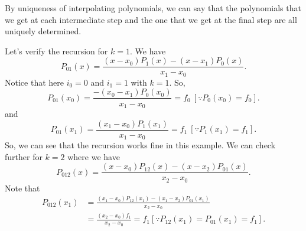 By uniqueness of interpolating polynomials, we can say that the polynomials that we get at each intermediate step and the one that we get at the final step are all uniquely determined.
\begin{example}
   Let's verify the recursion for $k=1$. We have 
   \[
      P_{01}(x) = \frac{(x-x_0)P_1(x) - (x-x_1)P_0(x)}{x_1-x_0}
   .\]
   Notice that here $ i_0 = 0$ and $ i_1=1$ with $k=1$. So,
   \[
      P_{01}(x_0) = \frac{-(x_0-x_1)P_0(x_0)}{x_1-x_0} = f_0 \ [\because P_0(x_0) = f_0]
   .\] 
   and 
   \[
      P_{01}(x_1) = \frac{(x_1-x_0)P_1(x_1)}{x_1-x_0} = f_1 \ [\because P_1(x_1) = f_1]
   .\]
   So, we can see that the recursion works fine in this example.
   We can check further for $k=2$ where we have 
    \[
       P_{012}(x) = \frac{(x-x_0)P_{12}(x) - (x-x_2)P_{01}(x)}{x_2-x_0}
   .\] 
   Note that
   \begin{align*}
      P_{012}(x_1) &= \frac{(x_1-x_0)P_{12}(x_1)-(x_1-x_2)P_{01}(x_1)}{x_2-x_0} \\
                   &= \frac{(x_2-x_0)f_1}{x_2-x_0} = f_1 [\because P_{12}(x_1)=P_{01}(x_1)=f_1]
   .\end{align*}
\end{example}


